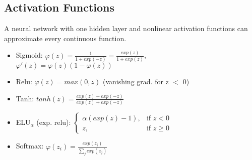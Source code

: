\subsection{Activation Functions}

A neural network with one hidden layer and nonlinear activation functions can approximate every continuous function.

\begin{itemize}
    \item Sigmoid: $\varphi(z) = \frac{1}{1+ exp(-z)} = \frac{exp(z)}{1+exp(z)}$, \\$\varphi'(z) = \varphi(z)(1-\varphi(z))$
    \item Relu: $\varphi(z) = max(0,z)$ (vanishing grad. for z $<$ 0)
    \item Tanh: $tanh(z) = \frac{exp(z)-exp(-z)}{exp(z)+exp(-z)}$
    \item ELU$_\alpha$ (exp. relu): $\begin{cases}
        \alpha (exp(z)-1),& \text{if } z<0\\
        z, & \text{if } z \geq 0
    \end{cases}$
    \item Softmax: $\varphi(z_i) = \frac{exp(z_i)}{\sum_{j}exp(z_j)}$
\end{itemize}
